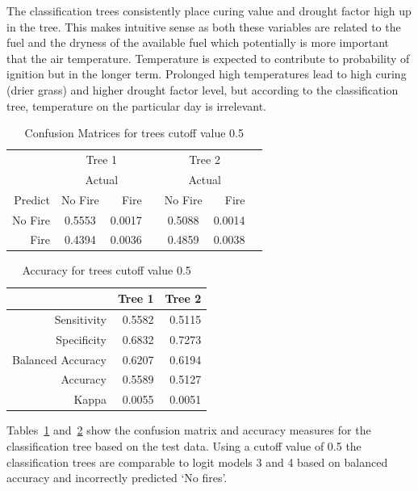 \documentclass[11pt,a4paper]{article}
\begin{document}
The classification trees consistently place  curing value and drought factor high up in the tree. This makes intuitive sense as both these variables are related to the fuel and the dryness of the available fuel which potentially is more important that the air temperature. Temperature is expected to contribute to probability of ignition but in the longer term. Prolonged high temperatures lead to high curing (drier grass) and higher drought factor level, but according to the classification tree, temperature on the particular day is irrelevant.

\begin{table}
  \centering

  \begin{tabular}{rcrrcrr}
    & \multicolumn{2}{c}{Tree 1} &
    & \multicolumn{2}{c}{Tree 2} & \\
    \cmidrule{2-3}\cmidrule{5-6}
    & \multicolumn{2}{c}{Actual} &
    & \multicolumn{2}{c}{Actual} &  \\
    Predict & No Fire & Fire   & & No Fire & Fire\\
    \cmidrule{2-3}\cmidrule{5-6}
    No Fire & 0.5553  & 0.0017 & & 0.5088  & 0.0014 \\
    Fire    & 0.4394  & 0.0036 & & 0.4859  & 0.0038 \\
    \cmidrule{2-3}\cmidrule{5-6}
  \end{tabular}
  \caption{Confusion Matrices for trees cutoff value 0.5}
  \label{table:tcm2}
\end{table}


\begin{table}
  \centering
  \begin{tabular}{rrr}
    \toprule
                      & Tree 1 & Tree 2 \\
    \midrule
    Sensitivity       & 0.5582 & 0.5115 \\
    Specificity       & 0.6832 & 0.7273 \\
    Balanced Accuracy & 0.6207 & 0.6194 \\
    Accuracy          & 0.5589 & 0.5127 \\
    Kappa             & 0.0055 & 0.0051 \\
    \bottomrule
  \end{tabular}
  \caption{Accuracy for trees cutoff value 0.5}
  \label{table:tacc2}
\end{table}

Tables~\ref{table:tcm2} and~\ref{table:tacc2} show the confusion matrix and accuracy measures for the classification tree based on the test data. Using a cutoff value of 0.5 the classification trees are comparable to logit models 3 and 4 based on balanced accuracy and incorrectly predicted `No fires'.
\end{document}
